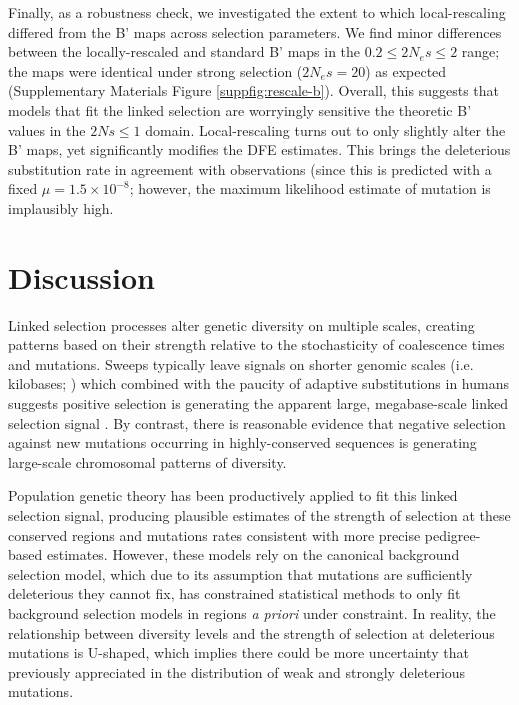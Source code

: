 \documentclass[11pt]{article}
\begin{document}
Finally, as a robustness check, we investigated the extent to which
local-rescaling differed from the B' maps across selection parameters. We find
minor differences between the locally-rescaled and standard B' maps in the $0.2
\le 2N_e s \le 2$ range; the maps were identical under strong selection ($2N_e
s= 20$) as expected (Supplementary Materials Figure \ref{suppfig:rescale-b}).
Overall, this suggests that models that fit the linked selection are worryingly
sensitive the theoretic B' values in the $2Ns \le 1$ domain. Local-rescaling
turns out to only slightly alter the B' maps, yet significantly modifies the
DFE estimates. This brings the deleterious substitution rate in agreement with
observations (since this is predicted with a fixed $\mu = 1.5 \times 10^{-8}$;
however, the maximum likelihood estimate of mutation is implausibly high.

\section*{Discussion}

Linked selection processes alter genetic diversity on multiple scales, creating
patterns based on their strength relative to the stochasticity of coalescence
times and mutations. Sweeps typically leave signals on shorter genomic scales
(i.e. kilobases; \cite{Akey2004-zg}) which combined with the paucity of
adaptive substitutions in humans suggests positive selection is generating the
apparent large, megabase-scale linked selection signal
\parencite{Hernandez2011-gs,Murphy2022-sj}. By contrast, there is reasonable
evidence that negative selection against new mutations occurring in
highly-conserved sequences is generating large-scale chromosomal patterns of
diversity. 

Population genetic theory has been productively applied to fit this linked
selection signal, producing plausible estimates of the strength of selection at
these conserved regions and mutations rates consistent with more precise
pedigree-based estimates. However, these models rely on the canonical
background selection model, which due to its assumption that mutations are
sufficiently deleterious they cannot fix, has constrained statistical methods
to only fit background selection models in regions \emph{a priori} under
constraint. In reality, the relationship between diversity levels and the
strength of selection at deleterious mutations is U-shaped, which implies there
could be more uncertainty that previously appreciated in the distribution of
weak and strongly deleterious mutations.
\end{document}
